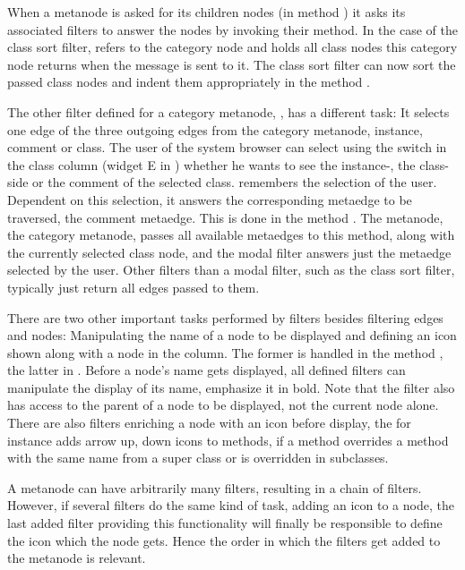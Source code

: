 \documentclass[a4paper,10pt,twoside]{book}
\begin{document}
When a metanode is asked for its children nodes (in method ) it asks its associated filters to answer the nodes by invoking their  method. In the case of the class sort filter,  refers to the category node and  holds all class nodes this category node returns when the message  is sent to it. The class sort filter can now sort the passed class nodes and indent them appropriately in the method .

The other filter defined for a category metanode, , has a different task: It selects one edge of the three outgoing edges from the category metanode, \ie instance, comment or class.  The user of the system browser can select using the switch in the class column (widget E in ) whether he wants to see the instance-, the class-side or the comment of the selected class.  remembers the selection of the user. Dependent on this selection, it answers the corresponding metaedge to be traversed, \eg the comment metaedge. This is done in the method . The metanode, \ie the category metanode, passes all available metaedges to this method, along with the currently selected class node, and the modal filter answers just the metaedge selected by the user. Other filters than a modal filter, such as the class sort filter, typically just return all edges passed to them.

There are two other important tasks performed by filters besides filtering edges and nodes: Manipulating the name of a node to be displayed and defining an icon shown along with a node in the column. The former is handled in the method , the latter in . Before a node's name gets displayed, all defined filters can manipulate the display of its name, \eg emphasize it in bold. Note that the filter also has access to the parent of a node to be displayed, not the current node alone. There are also filters enriching a node with an icon before display, the  for instance adds arrow up, down icons to methods, if a method overrides a method with the same name from a super class or is overridden in subclasses.

A metanode can have arbitrarily many filters, resulting in a chain of filters. However, if several filters do the same kind of task, \eg adding an icon to a node, the last added filter providing this functionality will finally be responsible to define the icon which the node gets. Hence the order in which the filters get added to the metanode is relevant. 
\end{document}
